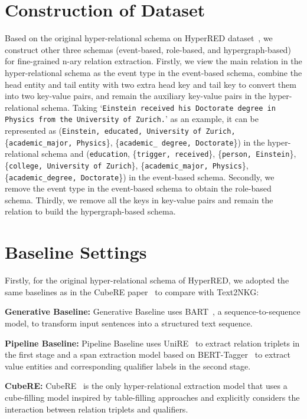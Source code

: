 \documentclass{article} \usepackage{iclr2024_conference,times}
\begin{document}
\section{Construction of Dataset}
\label{datasetc}
Based on the original hyper-relational schema on HyperRED dataset~\citep{HyperRED}, we construct other three schemas (event-based, role-based, and hypergraph-based) for fine-grained n-ary relation extraction. Firstly, we view the main relation in the hyper-relational schema as the event type in the event-based schema, combine the head entity and tail entity with two extra head key and tail key to convert them into two key-value pairs, and remain the auxiliary key-value pairs in the hyper-relational schema. Taking ‘\texttt{Einstein received his Doctorate degree in Physics from the University of Zurich.}' as an example, it can be represented as (\texttt{Einstein, educated, University of Zurich,} \{\texttt{academic\_major, Physics}\}, \{\texttt{academic\_ degree, Doctorate}\}) in the hyper-relational schema and (\texttt{education}, \{\texttt{trigger, received}\}, \{\texttt{person, Einstein}\}, \{\texttt{college, University\ of\ Zurich}\}, \{\texttt{academic\_major, Physics}\},\{\texttt{academic\_degree, Doctorate}\}) in the event-based schema. Secondly, we remove the event type in the event-based schema to obtain the role-based schema. Thirdly, we remove all the keys in key-value pairs and remain the relation to build the hypergraph-based schema.

\section{Baseline Settings}
\label{baseline}

Firstly, for the original hyper-relational schema of HyperRED, we adopted the same baselines as in the CubeRE paper~\citep{HyperRED} to compare with Text2NKG:

\textbf{Generative Baseline: }
Generative Baseline uses BART~\citep{BART}, a sequence-to-sequence model, to transform input sentences into a structured text sequence.


\textbf{Pipeline Baseline: }
Pipeline Baseline uses UniRE~\citep{UniRE} to extract relation triplets in the first stage and a span extraction model based on BERT-Tagger~\citep{Bert} to extract value entities and corresponding qualifier labels in the second stage.

\textbf{CubeRE: }
CubeRE~\citep{HyperRED} is the only hyper-relational extraction model that uses a cube-filling model inspired by table-filling approaches and explicitly considers the interaction between relation triplets and qualifiers.
\end{document}
